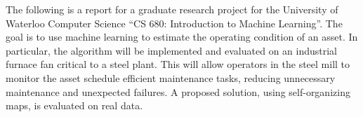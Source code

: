 The following is a report for a graduate research project for the University of Waterloo Computer Science ``CS 680: Introduction to Machine Learning''.
The goal is to use machine learning to estimate the operating condition of an asset.
In particular, the algorithm will be implemented and evaluated on an industrial furnace fan critical to a steel plant.
This will allow operators in the steel mill to monitor the asset schedule efficient maintenance tasks, reducing unnecessary maintenance and unexpected failures.
A proposed solution, using self-organizing maps, is evaluated on real data.
